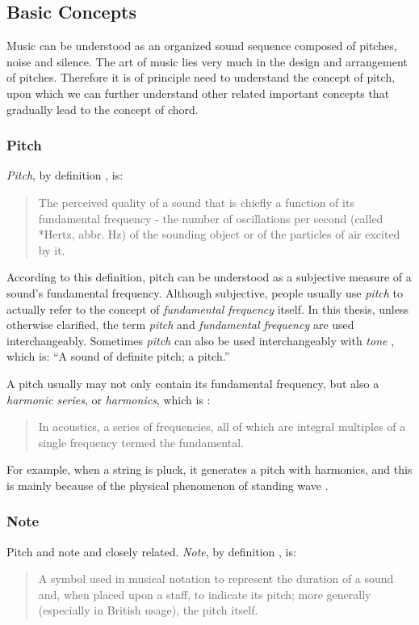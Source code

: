 \subsection{Basic Concepts}
Music can be understood as an organized sound sequence composed of pitches, noise and silence. The art of music lies very much in the design and arrangement of pitches. Therefore it is of principle need to understand the concept of pitch, upon which we can further understand other related important concepts that gradually lead to the concept of chord.

\subsubsection{Pitch}
{\it Pitch}, by definition \cite{randel1999harvard}, is:
\begin{quote}
The perceived quality of a sound that is chiefly a function of its fundamental frequency - the number of oscillations per second (called *Hertz, abbr. Hz) of the sounding object or of the particles of air excited by it.
\end{quote}
According to this definition, pitch can be understood as a subjective measure of a sound's fundamental frequency. Although subjective, people usually use {\it pitch} to actually refer to the concept of {\it fundamental frequency} itself. In this thesis, unless otherwise clarified, the term {\it pitch} and {\it fundamental frequency} are used interchangeably. Sometimes {\it pitch} can also be used interchangeably with {\it tone} \cite{randel1999harvard}, which is: ``A sound of definite pitch; a pitch.''

A pitch usually may not only contain its fundamental frequency, but also a {\it harmonic series}, or {\it harmonics}, which is \cite{randel1999harvard}:
\begin{quote}
In acoustics, a series of frequencies, all of which are integral multiples of a single frequency termed the fundamental.
\end{quote}
For example, when a string is pluck, it generates a pitch with harmonics, and this is mainly because of the physical phenomenon of standing wave \cite{helmholtz2009sensations}.

\subsubsection{Note}
Pitch and note and closely related. {\it Note}, by definition \cite{randel1999harvard}, is:
\begin{quote}
A symbol used in musical notation to represent the duration of a sound and, when placed upon a staff, to indicate its pitch; more generally (especially in British usage), the pitch itself.
\end{quote}

